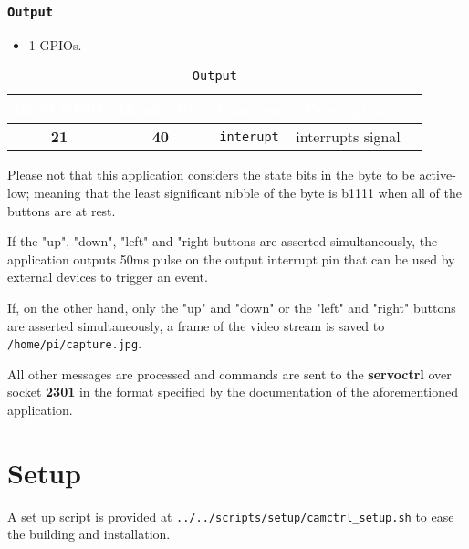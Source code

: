    \subsubsection{\texttt{Output}}
   \begin{itemize}
      \item 1 GPIOs.
   \end{itemize}
   \begin{table}[!htb]
      \begin{center}
         \begin{tabular}{|c|c|c|c|c|}
            \rowcolor{black}
            \textcolor{white}{\textbf{BCM GPIO}}  &
            \textcolor{white}{\textbf{Header Pin}} &
            \textcolor{white}{\textbf{Function}} &
            \textcolor{white}{\textbf{Description}}\\
            \hline
            \hline
            \textbf{21} & \textbf{40} &
               \texttt{interupt} & interrupts signal \\
            \hline
         \end{tabular}
         \caption{\texttt{Output}}
         \label{table:output}
      \end{center}
   \end{table}

Please not that this application considers the state bits in the byte to be
active-low; meaning that the least significant nibble of the byte is b1111 when
all of the buttons are at rest.

If the "up", "down", "left" and "right buttons are asserted simultaneously, the
application outputs 50ms pulse on the output interrupt pin that can be used by
external devices to trigger an event.

If, on the other hand, only the "up" and "down" or the "left" and "right"
buttons are asserted simultaneously, a frame of the video stream is saved to
\texttt{/home/pi/capture.jpg}.

All other messages are processed and commands are sent to the \textbf{servoctrl}
over socket \textbf{2301} in the format specified by the documentation of the
aforementioned application.

\section{Setup}
A set up script is provided at \texttt{../../scripts/setup/camctrl\_setup.sh}
to ease the building and installation.


